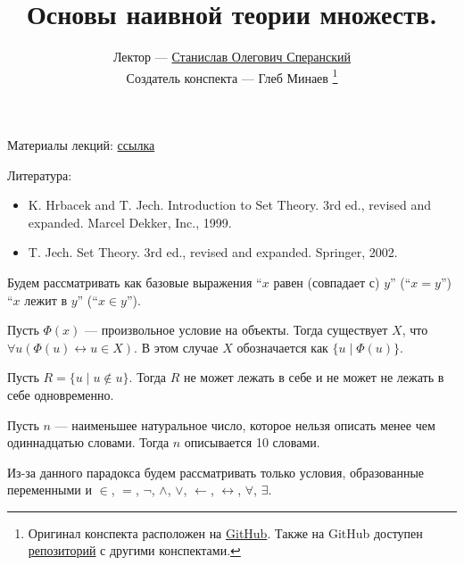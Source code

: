 \documentclass[12pt,a4paper]{article}
\title{Основы наивной теории множеств.}
\author{Лектор --- \href{https://users.math-cs.spbu.ru/~speranski}{Станислав Олегович Сперанский} \\
        Создатель конспекта --- Глеб Минаев
        \footnote{Оригинал конспекта расположен на \href{https://github.com/lounres/SPbU-MCS-2020-M-lecture-notes/blob/master/\%D0\%9D\%D0\%A2\%D0\%9C/ST.pdf}{GitHub}. Также на GitHub доступен \href{https://github.com/lounres/SPbU-MCS-2020-M-lecture-notes}{репозиторий} с другими конспектами.}}
\date{}
\begin{document}
    \maketitle

    Материалы лекций: \href{https://users.math-cs.spbu.ru/~speranski/courses/sets-2020-autumn/materials.html}{ссылка}
    
    Литература:
    \begin{itemize}
        \item K. Hrbacek and T. Jech. Introduction to Set Theory. 3rd ed., revised and expanded. Marcel Dekker, Inc., 1999.
        \item T. Jech. Set Theory. 3rd ed., revised and expanded. Springer, 2002.
    \end{itemize}

    Будем рассматривать как базовые выражения ``$x$ равен (совпадает с) $y$'' (``$x=y$'') ``$x$ лежит в $y$'' (``$x\in y$'').

    \begin{definition}
        Пусть $\Phi(x)$ --- произвольное условие на объекты. Тогда существует $X$, что $\forall u (\Phi(u) \leftrightarrow u \in X)$. В этом случае $X$ обозначается как $\{u \mid \Phi(u)\}$.
    \end{definition}

    \begin{statement}
        Пусть $R = \{u \mid u \notin u\}$. Тогда $R$ не может лежать в себе и не может не лежать в себе одновременно.
    \end{statement}

    \begin{statement}
        Пусть $n$ --- наименьшее натуральное число, которое нельзя описать менее чем одиннадцатью словами. Тогда $n$ описывается 10 словами.
    \end{statement}

    Из-за данного парадокса будем рассматривать только условия, образованные переменными и $\in$, $=$, $\neg$, $\wedge$, $\vee$, $\leftarrow$, $\leftrightarrow$, $\forall$, $\exists$.
\end{document}
